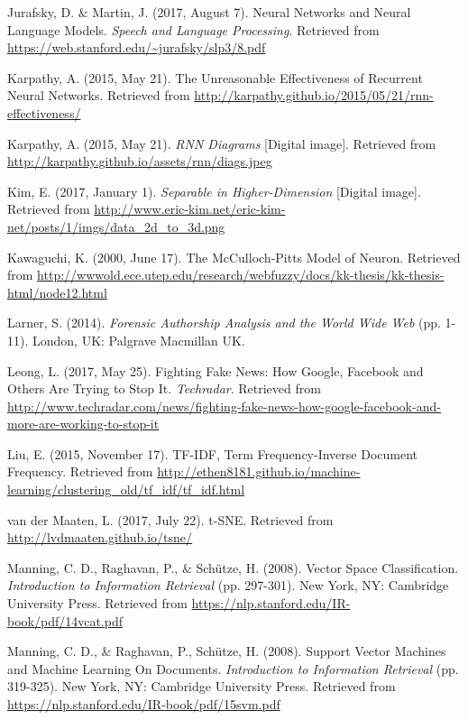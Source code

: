 \begin{thebibliography}{99}
Jurafsky, D. \& Martin, J. (2017, August 7). Neural Networks and Neural
Language Models. \textit{Speech and Language Processing}. Retrieved from \url{https://web.stanford.edu/~jurafsky/slp3/8.pdf}

Karpathy, A. (2015, May 21). The Unreasonable Effectiveness of Recurrent Neural Networks. Retrieved from \url{http://karpathy.github.io/2015/05/21/rnn-effectiveness/}

Karpathy, A. (2015, May 21). \textit{RNN Diagrams} [Digital image]. Retrieved from \url{http://karpathy.github.io/assets/rnn/diags.jpeg}

Kim, E. (2017, January 1). \textit{Separable in Higher-Dimension} [Digital image]. Retrieved from \url{http://www.eric-kim.net/eric-kim-net/posts/1/imgs/data\_2d\_to\_3d.png}

Kawaguchi, K. (2000, June 17). The McCulloch-Pitts Model of Neuron. Retrieved from \url{http://wwwold.ece.utep.edu/research/webfuzzy/docs/kk-thesis/kk-thesis-html/node12.html}

Larner, S. (2014). \textit{Forensic Authorship Analysis and the World Wide Web} (pp. 1-11). London, UK: Palgrave Macmillan UK.

Leong, L. (2017, May 25). Fighting Fake News: How Google, Facebook and Others Are Trying to Stop It. \textit{Techradar}. Retrieved from \url{http://www.techradar.com/news/fighting-fake-news-how-google-facebook-and-more-are-working-to-stop-it}

Liu, E. (2015, November 17). TF-IDF, Term Frequency-Inverse Document Frequency. Retrieved from \url{http://ethen8181.github.io/machine-learning/clustering\_old/tf\_idf/tf\_idf.html}

van der Maaten, L. (2017, July 22). t-SNE. Retrieved from \url{http://lvdmaaten.github.io/tsne/}

Manning, C. D., Raghavan, P., \& Sch\"utze, H. (2008). Vector Space Classification. \textit{Introduction to Information Retrieval} (pp. 297-301). New York, NY: Cambridge University Press. Retrieved from \url{https://nlp.stanford.edu/IR-book/pdf/14vcat.pdf}

Manning, C. D., \& Raghavan, P., Sch\"utze, H. (2008). Support Vector Machines and Machine Learning On Documents. \textit{Introduction to Information Retrieval} (pp. 319-325). New York, NY: Cambridge University Press. Retrieved from \url{https://nlp.stanford.edu/IR-book/pdf/15svm.pdf}


\end{thebibliography}
